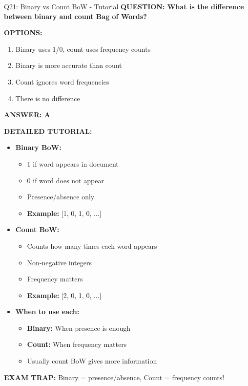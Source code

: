 \documentclass[8pt]{beamer}
\begin{document}
	\begin{frame}{Q21: Binary vs Count BoW - Tutorial}
		\fontsize{6.5}{7.5}\selectfont
		\textbf{QUESTION: What is the difference between binary and count Bag of Words?}
		
		\vspace{0.1cm}
		\textbf{OPTIONS:}
		\begin{enumerate}
			\item Binary uses 1/0, count uses frequency counts
			\item Binary is more accurate than count
			\item Count ignores word frequencies
			\item There is no difference
		\end{enumerate}
		
		\vspace{0.1cm}
		\textcolor{myblue}{\textbf{ANSWER: A}}
		
		\vspace{0.1cm}
		\textbf{DETAILED TUTORIAL:}
		\begin{itemize}
			\item \textbf{Binary BoW:}
			\begin{itemize}
				\item 1 if word appears in document
				\item 0 if word does not appear
				\item Presence/absence only
				\item \textbf{Example:} [1, 0, 1, 0, ...]
			\end{itemize}
			\item \textbf{Count BoW:}
			\begin{itemize}
				\item Counts how many times each word appears
				\item Non-negative integers
				\item Frequency matters
				\item \textbf{Example:} [2, 0, 1, 0, ...]
			\end{itemize}
			\item \textbf{When to use each:}
			\begin{itemize}
				\item \textbf{Binary:} When presence is enough
				\item \textbf{Count:} When frequency matters
				\item Usually count BoW gives more information
			\end{itemize}
		\end{itemize}
		
		\textcolor{myred}{\textbf{EXAM TRAP:}} Binary = \textcolor{myblue}{presence/absence}, Count = \textcolor{myblue}{frequency counts}!
	\end{frame}
	
\end{document}
